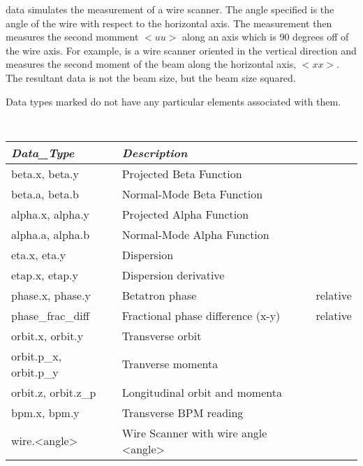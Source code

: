  data simulates the measurement of a wire scanner. The angle specified
is the angle of the wire with respect to the horizontal axis. The measurement
then measures the second momment $<uu>$ along an axis which is 90 degrees off of
the wire axis. For example,  is a wire scanner oriented in the
vertical direction and measures the second moment of the beam along the
horizontal axis, $<xx>$. The resultant data is not the beam size, but the beam
size squared.

Data types marked  do not have any particular elements
associated with them.


\begin{table}[ht] 
\centering 
{\tt
\begin{tabular}{|l|l|l|} \hline
  {\it Data\_Type}        & {\it Description}                 &          \\ \hline 
    beta.x, beta.y        & Projected Beta Function           &          \\ \hline 
    beta.a, beta.b        & Normal-Mode Beta Function         &          \\ \hline 
    alpha.x, alpha.y      & Projected Alpha Function          &          \\ \hline 
    alpha.a, alpha.b      & Normal-Mode Alpha Function        &          \\ \hline 
    eta.x, eta.y          & Dispersion                        &          \\ \hline 
    etap.x, etap.y        & Dispersion derivative             &          \\ \hline 
    phase.x, phase.y      & Betatron phase                    & relative \\ \hline 
    phase\_frac\_diff     & Fractional phase difference (x-y) & relative \\ \hline
    orbit.x, orbit.y      & Transverse orbit                  &          \\ \hline 
    orbit.p\_x, orbit.p\_y& Tranverse momenta                 &          \\ \hline 
    orbit.z, orbit.z\_p   & Longitudinal orbit and momenta    &          \\ \hline 
    bpm.x, bpm.y          & Transverse BPM reading            &          \\ \hline 
    wire.<angle>          & Wire Scanner with wire angle <angle>
                                                              &          \\ \hline

\end{tabular}}
\end{table}

